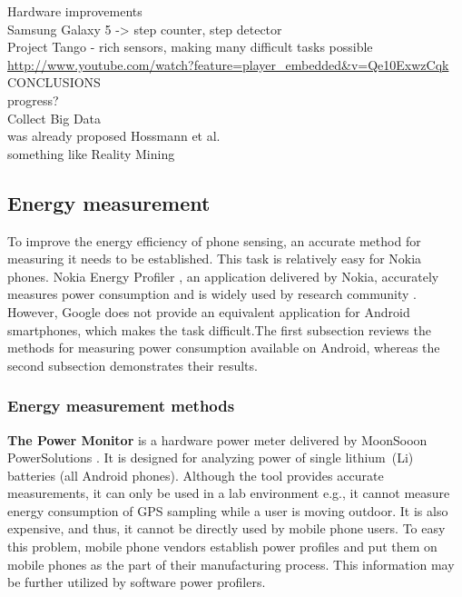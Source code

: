 Hardware improvements\\
	Samsung Galaxy 5 -> step counter, step detector\\
	Project Tango - rich sensors, making many difficult tasks possible\cite{google:tango}\\
		\url{http://www.youtube.com/watch?feature=player_embedded&v=Qe10ExwzCqk}
CONCLUSIONS\\
	progress?\\
	Collect Big Data\\
		was already proposed Hossmann et al.\cite{hossmann:bigdatasets}\\
		something like Reality Mining \cite{eagle:realitymining}\\
		
\subsection{Energy measurement}
\hspace{10pt} To improve the energy efficiency of phone sensing, an accurate method for measuring it needs to be established. This task is relatively easy for Nokia phones. Nokia Energy Profiler \cite{nokia:profiler}, an application delivered by Nokia,  accurately measures power consumption and is widely used by research community \cite{kjaergaard:entracked} \cite{lu:jigsaw} \cite{li:status}. However, Google does not provide an equivalent application for Android smartphones, which makes the task difficult.The first subsection reviews the methods for measuring power consumption available on Android, whereas the second subsection demonstrates their results.

\subsubsection{Energy measurement methods}

\hspace{10pt} \textbf{The Power Monitor} is a hardware power meter delivered by MoonSooon PowerSolutions \cite{monsoon:powermonitor}.  It is designed for analyzing power of single lithium\ (Li) batteries (all Android phones). Although the tool provides accurate measurements, it can only be used in a lab environment e.g., it cannot measure energy consumption of GPS sampling while a user is moving outdoor. It is also expensive, and thus, it cannot be directly used by mobile phone users. To easy this problem, mobile phone vendors establish power profiles and put them on mobile phones \cite{android:powerprofiles} as the part of their manufacturing process. This information may be further utilized by software power profilers.

